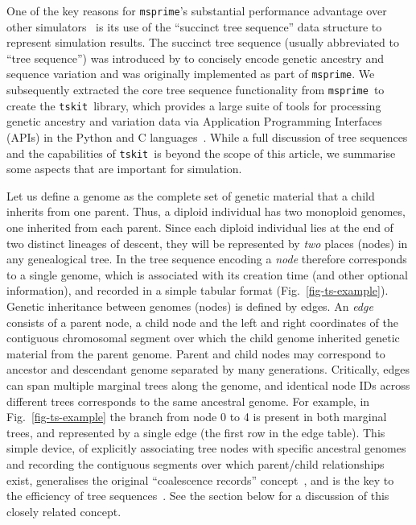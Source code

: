 \documentclass{article}
\newcommand{\msprime}[0]{\texttt{msprime}}
\newcommand{\tskit}[0]{\texttt{tskit}}
\begin{document}
One of the key reasons for \msprime's substantial performance advantage
over other simulators~\citep{kelleher2016efficient}
is its use of the ``succinct tree sequence''
data structure to represent simulation results.
The succinct tree sequence (usually abbreviated to ``tree sequence'')
was introduced by \cite{kelleher2016efficient}
to concisely encode genetic ancestry and sequence variation
and was originally implemented as part of \msprime.
We subsequently extracted the core tree sequence functionality
from \msprime\ to create the \tskit\ library,
which provides a large suite of tools for processing genetic ancestry
and variation data via Application Programming Interfaces (APIs)
in the Python and C languages~\citep{tskit2021tskit}.
While a full discussion of tree sequences and the capabilities
of \tskit\ is beyond the scope of this article, we summarise
some aspects that are important for simulation.

Let us define a genome as the complete set of genetic material
that a child inherits from one parent. Thus, a diploid individual
has two monoploid genomes, one inherited from each parent. Since
each diploid individual lies at the end of two distinct lineages
of descent, they will be represented by \emph{two} places (nodes)
in any genealogical tree. In the tree sequence encoding a
\emph{node} therefore corresponds to a single genome, which
is associated with its creation time (and other optional information),
and recorded in a simple tabular format (Fig.~\ref{fig-ts-example}).
Genetic inheritance between genomes (nodes) %
is defined by edges.
An \emph{edge} consists of a
parent node, a child node and the left and right coordinates
of the contiguous chromosomal segment over which
the child genome inherited genetic material from the parent genome.
Parent and child nodes may correspond to ancestor and descendant
genome separated by many generations.
Critically, edges can span multiple marginal trees along the
genome, and identical node IDs across different trees corresponds
to the same ancestral genome.
For example, in Fig.~\ref{fig-ts-example} the branch from node
0 to 4 is present in both marginal trees, and represented
by a single edge (the first row in the edge table).
This simple device, of explicitly associating tree nodes
with specific ancestral genomes and recording the
contiguous segments over which parent/child relationships exist,
generalises the original
``coalescence records'' concept~\citep{kelleher2016efficient},
and is the key to the efficiency of tree
sequences~\citep{
kelleher2018efficient,kelleher2019inferring,ralph2020efficiently}.
See the  section below for a discussion of this
closely related concept.
\end{document}
